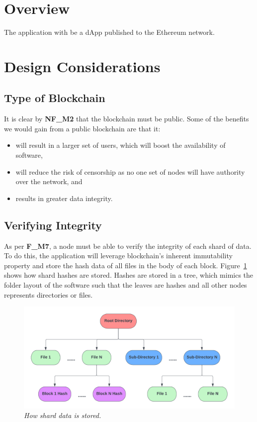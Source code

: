 
\section{Overview}

The application with be a dApp published to the Ethereum network.

\section{Design Considerations}

\subsection{Type of Blockchain}

It is clear by \textbf{NF\_M2} that the blockchain must be public. Some of the benefits we would gain from a public blockchain are that it:

\begin{itemize}
  \item will result in a larger set of users, which will boost the availability of software,
  \item will reduce the risk of censorship as no one set of nodes will have authority over the network, and
  \item results in greater data integrity.
\end{itemize}


\subsection{Verifying Integrity}

As per \textbf{F\_M7}, a node must be able to verify the integrity of each shard of data. To do this, the application will leverage blockchain's inherent immutability property and store the hash data of all files in the body of each block.
\x
Figure~\ref{fig:hash-storage} shows how shard hashes are stored. Hashes are stored in a tree, which mimics the folder layout of the software such that the leaves are hashes and all other nodes represents directories or files. 

\begin{figure}[ht]
  \centering
  \includegraphics[width=.85\textwidth]{diagrams/block-body.png}
  \caption{\textit{How shard data is stored.}}
  \label{fig:hash-storage}
\end{figure}


